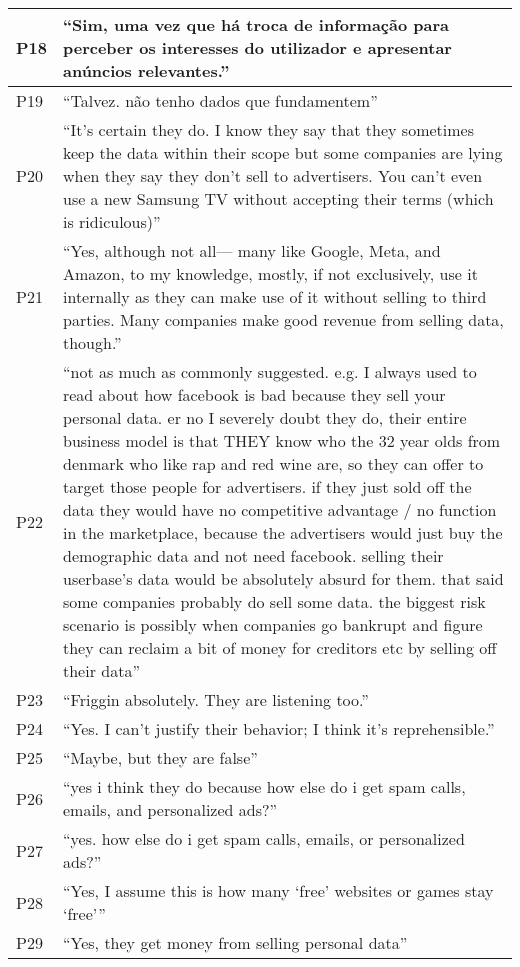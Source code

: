 \begin{longtable}{p{3cm} p{13cm}}
    \hline
    P18 & ``Sim, uma vez que há troca de informação para perceber os interesses do utilizador e apresentar anúncios relevantes.'' \\
    \hline
    P19 & ``Talvez. não tenho dados que fundamentem'' \\
    \hline
    P20 & ``It's certain they do. I know they say that they sometimes keep the data within their scope but some companies are lying when they say they don't sell to advertisers. You can't even use a new Samsung TV without accepting their terms (which is ridiculous)'' \\
    \hline
    P21 & ``Yes, although not all— many like Google, Meta, and Amazon, to my knowledge, mostly, if not exclusively, use it internally as they can make use of it without selling to third parties. Many companies make good revenue from selling data, though.'' \\
    \hline
    P22 & ``not as much as commonly suggested.  e.g. I always used to read about how facebook is bad because they sell your personal data.  er no I severely doubt they do, their entire business model is that THEY know who the 32 year olds from denmark who like rap and red wine are, so they can offer to target those people for advertisers.  if they just sold off the data they would have no competitive advantage / no function in the marketplace, because the advertisers would just buy the demographic data and not need facebook.  selling their userbase's data would be absolutely absurd for them.  that said some companies probably do sell some data.  the biggest risk scenario is possibly when companies go bankrupt and figure they can reclaim a bit of money for creditors etc by selling off their data'' \\
    \hline
    P23 & ``Friggin absolutely. They are listening too.'' \\
    \hline
    P24 & ``Yes. I can't justify their behavior; I think it's reprehensible.'' \\
    \hline
    P25 & ``Maybe, but they are false'' \\
    \hline
    P26 & ``yes i think they do because how else do i get spam calls, emails, and personalized ads?'' \\
    \hline
    P27 & ``yes. how else do i get spam calls, emails, or personalized ads?'' \\
    \hline
    P28 & ``Yes, I assume this is how many `free' websites or games stay `free''' \\
    \hline
    P29 & ``Yes, they get money from selling personal data'' \\

\end{longtable}
